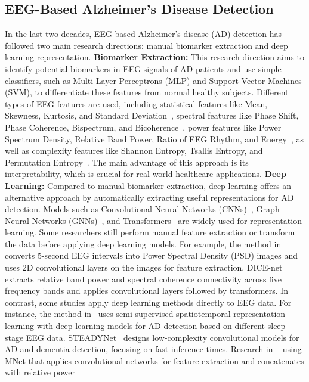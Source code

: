 

\subsection{EEG-Based Alzheimer’s Disease Detection}
\label{sub:eeg_ad_detection}

In the last two decades, EEG-based Alzheimer's disease (AD) detection has followed two main research directions: manual biomarker extraction and deep learning representation. \textbf{Biomarker Extraction:} This research direction aims to identify potential biomarkers in EEG signals of AD patients and use simple classifiers, such as Multi-Layer Perceptrons (MLP) and Support Vector Machines (SVM), to differentiate these features from normal healthy subjects. Different types of EEG features are used, including statistical features like Mean, Skewness, Kurtosis, and Standard Deviation~\cite{tzimourta2019eeg, tzimourta2019analysis, kulkarni2017extracting, kanda2014clinician, waser2013eeg, tylova2013predictive, mora2019scale}, spectral features like Phase Shift, Phase Coherence, Bispectrum, and Bicoherence~\cite{wang2017enhanced, cassani2014effects, wang2015multiple, fraga2013characterizing, tait2019network, waser2016quantifying, trambaiolli2011improving}, power features like Power Spectrum Density, Relative Band Power, Ratio of EEG Rhythm, and Energy~\cite{fahimi2017index, schmidt2013index, liu2016multiple, kanda2014clinician}, as well as complexity features like Shannon Entropy, Tsallis Entropy, and Permutation Entropy~\cite{garn2015quantitative, azami2019multiscale, tylova2018unbiased, coronel2017quantitative, al2018complexity}. The main advantage of this approach is its interpretability, which is crucial for real-world healthcare applications. \textbf{Deep Learning:} Compared to manual biomarker extraction, deep learning offers an alternative approach by automatically extracting useful representations for AD detection. Models such as Convolutional Neural Networks (CNNs)~\cite{li2022predictive, cura2022deep}, Graph Neural Networks (GNNs)~\cite{shan2022spatial, klepl2023adaptive}, and Transformers~\cite{wang2024adformer} are widely used for representation learning. Some researchers still perform manual feature extraction or transform the data before applying deep learning models. For example, the method in~\cite{ieracitano2019convolutional} converts 5-second EEG intervals into Power Spectral Density (PSD) images and uses 2D convolutional layers on the images for feature extraction. DICE-net~\cite{miltiadous2023dice} extracts relative band power and spectral coherence connectivity across five frequency bands and applies convolutional layers followed by transformers. In contrast, some studies apply deep learning methods directly to EEG data. For instance, the method in~\cite{gallego2024alzheimer} uses semi-supervised spatiotemporal representation learning with deep learning models for AD detection based on different sleep-stage EEG data. STEADYNet~\cite{kachare2024steadynet} designs low-complexity convolutional models for AD and dementia detection, focusing on fast inference times. Research in ~\cite{watanabe2024deep} using MNet that applies convolutional networks for feature extraction and concatenates with relative power 